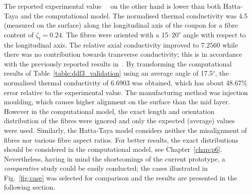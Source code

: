 	The reported experimental value~~\autocite{Choy.1994} on the other hand is lower than both Hatta-Taya and the computational model. The normalised thermal conductivity was 4.5 (measured on the surface) along the longitudinal axis of the coupon for a fibre content of $\zeta_{\text{f}}=0.24$. The fibres were oriented with a 15--20\textsuperscript{$\circ$} angle with respect to the longitudinal axis. The relative axial conductivity improved to $7.2560$ while there was no contribution towards transverse conductivity; this is in accordance with the previously reported results in~\autocite{Javanbakht.2016b}. By transforming the computational results of Table~\ref{table:ddf3_validation} using an average angle of 17.5\textsuperscript{$\circ$}, the normalised thermal conductivity of 6.6903 was obtained, which has about 48.67\% error relative to the experimental value. The manufacturing method was injection moulding, which causes higher alignment on the surface than the mid layer. However in the computational model, the exact length and orientation distribution of the fibres were ignored and only the expected (average) values were used. Similarly, the Hatta-Taya model considers neither the misalignment of fibres nor various fibre aspect ratios. For better results, the exact distributions should be considered in the computational model, see Chapter~\ref{chap:p6}. Nevertheless, having in mind the shortcomings of the current prototype, a \textit{comparative} study could be easily conducted; the cases illustrated in Fig.~\ref{fig:case} was selected for comparison and the results are presented in the following section.
	

	


	
	
	
	
	
	
	
	
	
	
	
	
	
	


